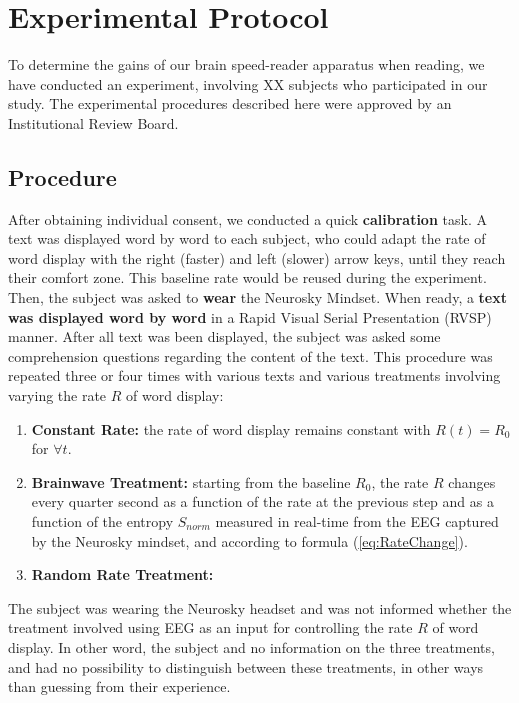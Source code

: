 \section{Experimental Protocol}
To determine the gains of our brain speed-reader apparatus when reading, we have conducted an experiment, involving XX subjects who participated in our study. The experimental procedures described here were approved by an Institutional Review Board. 

\subsection{Procedure}
After obtaining individual consent, we conducted a quick {\bf calibration} task. A text was displayed word by word to each subject, who could adapt the rate of word display with the right (faster) and left (slower) arrow keys, until they reach their comfort zone. This baseline rate would be reused during the experiment. Then, the subject was asked to {\bf wear} the Neurosky Mindset. When ready, a {\bf text was displayed word by word} in a Rapid Visual Serial Presentation (RVSP) manner. After all text was been displayed, the subject was asked some comprehension questions regarding the content of the text. This procedure was repeated three or four times with various texts and various treatments involving varying the rate $R$ of word display:

\begin{enumerate}
  \item {\bf Constant Rate: } the rate of word display remains constant with $R(t) = R_{0}$ for $\forall t$.  
  \item {\bf Brainwave Treatment: } starting from the baseline $R_0$, the rate $R$ changes every quarter second as a function of the rate at the previous step and as a function of the entropy $S_{norm}$ measured in real-time from the EEG captured by the Neurosky mindset, and according to formula (\ref{eq:RateChange}).
    \item {\bf Random Rate Treatment: }  %
\end{enumerate}

The subject was wearing the Neurosky headset and was not informed whether the treatment involved using EEG as an input for controlling the rate $R$ of word display. In other word, the subject and no information on the three treatments, and had no possibility to distinguish between these treatments, in other ways than guessing from their experience.

